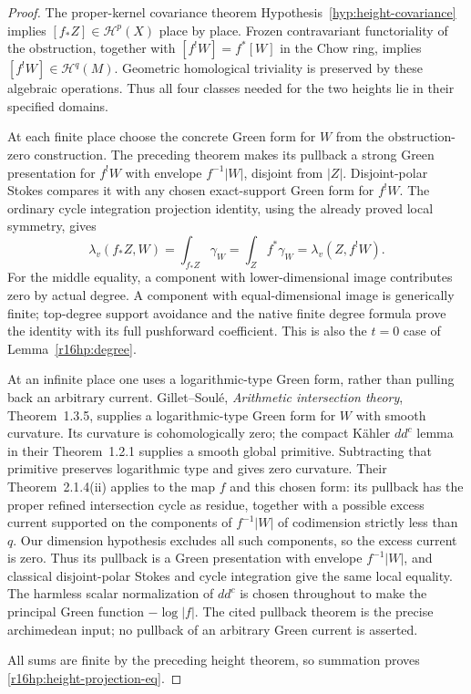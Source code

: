 \documentclass[11pt,a4paper]{article}
\theoremstyle{definition}
\theoremstyle{remark}
\numberwithin{equation}{section}
\begin{document}
\begin{proof}
The proper-kernel covariance theorem
Hypothesis~\ref{hyp:height-covariance} implies
$[f_*Z]\in\mathcal H^p(X)$ place by place. Frozen
contravariant functoriality of the obstruction, together with
$[f^!W]=f^*[W]$ in the Chow ring, implies
$[f^!W]\in\mathcal H^q(M)$. Geometric homological triviality
is preserved by these algebraic operations. Thus all four
classes needed for the two heights lie in their specified domains.

At each finite place choose the concrete Green form for $W$ from
the obstruction-zero construction. The preceding theorem makes its
pullback a strong Green presentation for $f^!W$ with envelope
$f^{-1}|W|$, disjoint from $|Z|$. Disjoint-polar Stokes compares
it with any chosen exact-support Green form for $f^!W$. The
ordinary cycle integration projection identity, using the already
proved local symmetry, gives
\[
 \lambda_v(f_*Z,W)=\int_{f_*Z}\gamma_W
                  =\int_Z f^*\gamma_W
                  =\lambda_v(Z,f^!W).
\]
For the middle equality, a component with lower-dimensional image
contributes zero by actual degree. A component with equal-dimensional
image is generically finite; top-degree support avoidance and the
native finite degree formula prove the identity with its full
pushforward coefficient. This is also the $t=0$ case of
Lemma~\ref{r16hp:degree}.

At an infinite place one uses a logarithmic-type Green form, rather
than pulling back an arbitrary current. Gillet--Soul\'e,
\emph{Arithmetic intersection theory}, Theorem~1.3.5, supplies a
logarithmic-type Green form for $W$ with smooth curvature. Its
curvature is cohomologically zero; the compact K\"ahler
$dd^c$ lemma in their Theorem~1.2.1 supplies a smooth global
primitive. Subtracting that primitive preserves logarithmic type
and gives zero curvature. Their Theorem~2.1.4(ii) applies to the
map $f$ and this chosen form: its pullback has the proper refined
intersection cycle as residue, together with a possible excess
current supported on the components of $f^{-1}|W|$ of codimension
strictly less than $q$. Our dimension hypothesis excludes all such
components, so the excess current is zero. Thus its pullback is a
Green presentation with envelope $f^{-1}|W|$, and classical
disjoint-polar Stokes and cycle integration give the same local
equality. The harmless scalar normalization of $dd^c$ is chosen
throughout to make the principal Green function $-\log|f|$.
The cited pullback theorem is the precise archimedean input;
no pullback of an arbitrary Green current is asserted.

All sums are finite by the preceding height theorem, so summation
proves \eqref{r16hp:height-projection-eq}.
\end{proof}
\end{document}
